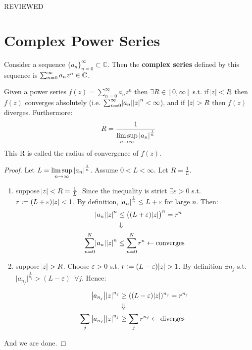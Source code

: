 \setcounter{section}{0}
\setcounter{theorem}{0}
REVIEWED

\section{Complex Power Series}

\begin{definition}
Consider a sequence $\{a_n\}_{n=0}^\infty \subset \mathbb{C}$. Then the \textbf{complex series} defined by this sequence is $\sum_{n=0}^\infty a_nz^n \in \mathbb{C}$.
\end{definition}

\begin{proposition}
Given a power series $f(z)=\sum_{n=0}^\infty a_nz^n$ then $\exists R \in [0,\infty]$ s.t. if $\abs{z}<R$ then $f(z)$ converges absolutely (i.e. $\sum_{n=0}^\infty \abs{a_n}\abs{z}^n < \infty$), and if $\,\abs{z}>R$ then $f(z)$ diverges. Furthermore:
\begin{align*}
R=\frac{1}{\limsup\limits_{n\rightarrow \infty} \, \abs{a_n}^\frac{1}{n}}
\end{align*}
This R is called the radius of convergence of $f(z)$.
\end{proposition}

\begin{proof}
Let $L=\limsup\limits_{n\rightarrow \infty} \, \abs{a_n}^\frac{1}{n}$. Assume $0<L<\infty$. Let $R=\frac{1}{L}$.

\begin{enumerate}
    \item suppose $\abs{z}<R=\frac{1}{L}$. Since the inequality is strict $\exists \varepsilon>0$ s.t. $r\vcentcolon=(L+\varepsilon)\abs{z}<1$. By definition, $\abs{a_n}^\frac{1}{n}\leq L+\varepsilon$ for large $n$. Then:
    \begin{align*}
        \abs{a_n} \abs{z}^n &\leq \left( \left( L+\varepsilon \right)\abs{z} \right)^n = r^n\\
        &\Downarrow\\
        \sum_{n=0}^N \abs{a_n}\abs{z}^n &\leq \sum_{n=0}^N r^n \leftarrow \text{converges}
    \end{align*}
    
    \item suppose $\abs{z}>R$. Choose $\varepsilon>0$ s.t. $r\vcentcolon=(L-\varepsilon)\abs{z}>1$. By definition $\exists n_j$ s.t. $\big|a_{n_j}\big|^\frac{1}{n_j}> (L-\varepsilon) \,\,\, \forall j$. Hence: 
    
    \begin{align*}
        \big|a_{n_j}\big|\abs{z}^{n_j} &\geq ((L-\varepsilon)\abs{z})^{n_j} = r^{n_j}\\
        &\Downarrow\\
        \sum_j \big|a_{n_j}\big|\abs{z}^{n_j} &\geq \sum_j r^{n_j} \leftarrow \text{diverges}
    \end{align*}
\end{enumerate}
And we are done.
\end{proof}

